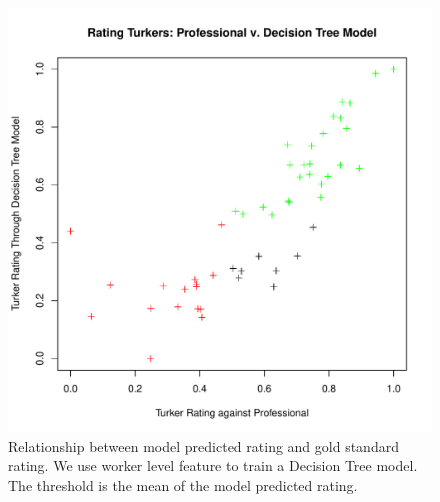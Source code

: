 \documentclass[11pt]{article}
\begin{document}
\begin{figure}[htbp]
  \centering
  \includegraphics[width=\linewidth]{Workerfeature/rrankingworkerfeaturedt.pdf}
  \caption{Relationship between model predicted rating and gold standard rating. We use worker level feature to train a Decision Tree model. The threshold is the mean of the model predicted rating.}
    \label{fdtworkerrrating1}
\end{figure}
\end{document}
